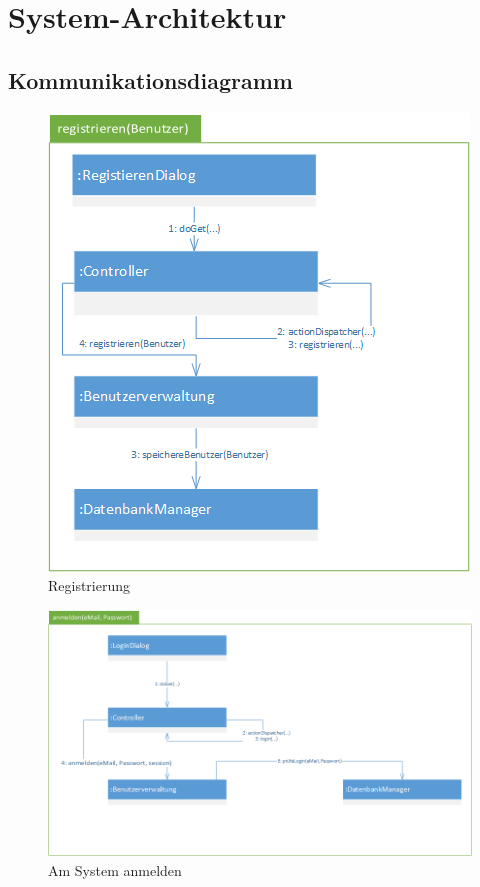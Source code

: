 \documentclass[12pt,a4paper]{article}
\begin{document}
\section{System-Architektur}

\subsection{Kommunikationsdiagramm}

\begin{figure}[H]
	\centering
	\includegraphics[width=0.7\linewidth]{Bilder/Kommunikationsdiagramme/registrieren}
	\caption{Registrierung}
	\label{Registrierung}
\end{figure}

\begin{figure}[H]
\centering
\includegraphics[width=0.7\linewidth]{Bilder/Kommunikationsdiagramme/anmelden}
\caption{Am System anmelden}
\label{Am System anmelden}
\end{figure}
\end{document}
